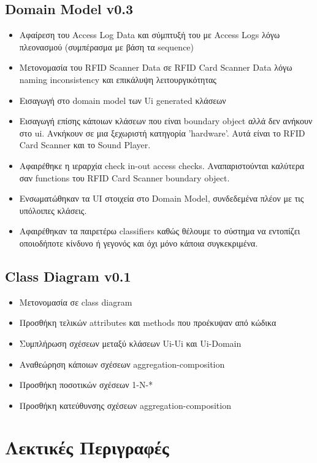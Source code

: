 \documentclass{article}
\begin{document}
\subsection{Domain Model v0.3}
\begin{itemize}
    \item Αφαίρεση του Access Log Data και σύμπτυξή του με Access Logs λόγω πλεονασμού (συμπέρασμα με βάση τα sequence)
    \item Μετονομασία του RFID Scanner Data σε RFID Card Scanner Data λόγω naming inconsistency και επικάλυψη λειτουργικότητας
    \item Εισαγωγή στο domain model των Ui generated κλάσεων
    \item Εισαγωγή επίσης κάποιων κλάσεων που είναι boundary object αλλά δεν ανήκουν στο ui. Ανκήκουν σε μια ξεχωριστή κατηγορία 'hardware'. Αυτά είναι το RFID Card Scanner και το Sound Player.
    \item Αφαιρέθηκε η ιεραρχία check in-out access checks. Αναπαριστούνται καλύτερα σαν functions του RFID Card Scanner boundary object.
    \item Ενσωματώθηκαν τα UI στοιχεία στο Domain Model, συνδεδεμένα πλέον με τις υπόλοιπες κλάσεις.
    \item Αφαιρέθηκαν τα παιρετέρω classifiers καθώς θέλουμε το σύστημα να εντοπίζει οποιοδήποτε κίνδυνο ή γεγονός και όχι μόνο κάποια συγκεκριμένα.
\end{itemize}


\subsection{Class Diagram v0.1}
\begin{itemize}
    \item Μετονομασία σε class diagram
    \item Προσθήκη τελικών attributes και methods που προέκυψαν από κώδικα
    \item Συμπλήρωση σχέσεων μεταξύ κλάσεων Ui-Ui και Ui-Domain
    \item Αναθεώρηση κάποιων σχέσεων aggregation-composition
    \item Προσθήκη ποσοτικών σχέσεων 1-Ν-*
    \item Προσθήκη κατεύθυνσης σχέσεων aggregation-composition 
\end{itemize}
\section{Λεκτικές Περιγραφές}
\end{document}
